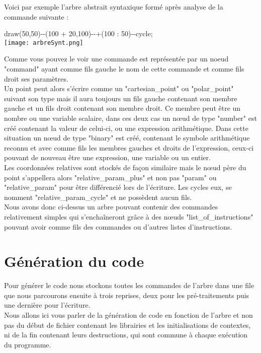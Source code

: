 \documentclass[a4paper,titlepage]{article}
\begin{document}
Voici par exemple l'arbre abstrait syntaxique formé après analyse de la commande suivante :

draw(50,50)\--\--(100 + 20,100)\--\--+(100 : 50)\--\--cycle;\\

\texttt{[image: arbreSynt.png]}

Comme vous pouvez le voir une commande est représentée par un noeud "command" ayant comme fils gauche le nom de cette commande et comme fils droit ses paramètres.\\
Un point peut alors s'écrire comme un "cartesian\_point" ou "polar\_point" suivant son type mais il aura toujours un fils gauche contenant son membre gauche et un fils droit contenant son membre droit.
Ce membre peut être un nombre ou une variable scalaire, dans ces deux cas un nœud de type "number" est créé contenant la valeur de celui-ci, ou une expression arithmétique. Dans cette situation un nœud de type "binary" est créé, contenant le symbole arithmétique reconnu et avec comme fils les membres gauches et droits de l'expression, ceux-ci pouvant de nouveau être une expression, une variable ou un entier.\\
Les coordonnées relatives sont stockés de façon similaire mais le nœud père du point s'appellera alors "relative\_param\_plus" et non pas "param" ou "relative\_param" pour être différencié lors de l'écriture. Les cycles eux, se nomment "relative\_param\_cycle" et ne possèdent aucun fils.\\

Nous avons donc ci-dessus un arbre pouvant contenir des commandes relativement simples qui s'enchaîneront grâce à des nœuds "list\_of\_instructions" pouvant avoir comme fils des commandes ou d'autres listes d'instructions.

\newpage
\section{Génération du code}

Pour générer le code nous stockons toutes les commandes de l'arbre dans une file que nous parcourons ensuite à trois reprises, deux pour les pré-traitements puis une dernière pour l'écriture.\\
Nous allons ici vous parler de la génération de code en fonction de l'arbre et non pas du début de fichier contenant les librairies et les initialisations de contextes, ni de la fin contenant leurs destructions, qui sont commune à chaque exécution du programme.
\end{document}
